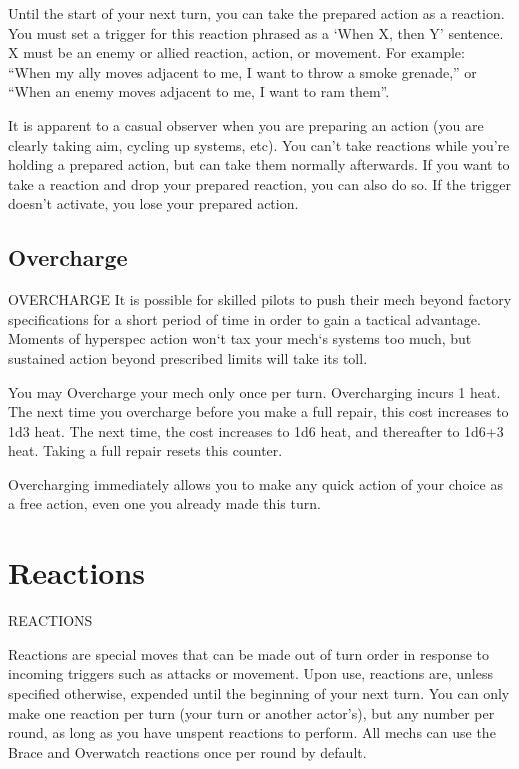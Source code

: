 Until the start of your next turn, you can take the prepared action as a reaction. You must set a  
trigger for this reaction phrased as a ‘When X, then Y’ sentence. X must be an enemy or allied  
reaction, action, or movement. For example: “When my ally moves adjacent to me, I want to  
throw a smoke grenade,” or “When an enemy moves adjacent to me, I want to ram them”.
 

It is apparent to a casual observer when you are preparing an action (you are clearly taking aim,  
cycling up systems, etc). You can’t take reactions while you’re holding a prepared action, but can  
take them normally afterwards. If you want to take a reaction and drop your prepared reaction,  
you can also do so. If the trigger doesn’t activate, you lose your prepared action.
 
\subsection{Overcharge}
                                            OVERCHARGE  
It is possible for skilled pilots to push their mech beyond factory specifications for a short period  
of time in order to gain a tactical advantage. Moments of hyperspec action won‘t tax your  
mech‘s systems too much, but sustained action beyond prescribed limits will take its toll. 
 

                                                                                                              


You may Overcharge your mech only once per turn. Overcharging incurs 1 heat. The next time  
you overcharge before you make a full repair, this cost increases to 1d3 heat. The next time, the  
cost increases to 1d6 heat, and thereafter to 1d6+3 heat. Taking a full repair resets this counter.
 

Overcharging immediately allows you to make any quick action of your choice as a free  
action, even one you already made this turn. 

\section{Reactions}
                                        REACTIONS  

Reactions are special moves that can be made out of turn order in response to incoming triggers  
such as attacks or movement. Upon use, reactions are, unless specified otherwise, expended  
until the beginning of your next turn. You can only make one reaction per turn (your turn or  
another actor’s), but any number per round, as long as you have unspent reactions to perform.  
All mechs can use the Brace and Overwatch reactions once per round by default.
 
